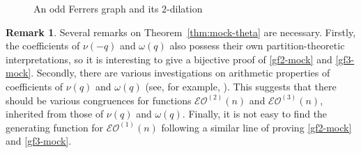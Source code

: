 \documentclass[12pt,reqno]{amsart}
\numberwithin{equation}{section}
\theoremstyle{plain}
\theoremstyle{definition}
\newtheorem{remark}[theorem]{Remark}
\def\EO{\mathcal{EO}}
\begin{document}
\begin{figure}[tbh]
\begin{ferrers}
\end{ferrers}
\caption{An odd Ferrers graph and its $2$-dilation}
\label{fig:2-oddFer}
\end{figure}

\begin{remark}
Several remarks on Theorem~\ref{thm:mock-theta} are necessary. Firstly, the coefficients of $\nu(-q)$ and
$\omega(q)$ also possess their own partition-theoretic interpretations, so it is interesting to give a bijective
proof of \eqref{gf2-mock} and \eqref{gf3-mock}. Secondly, there are various investigations on arithmetic
properties of coefficients of $\nu(q)$ and $\omega(q)$ (see, for example, \cite{GP, BO, APSY}). This suggests
that there should be various congruences for functions $\EO^{(2)}(n)$ and $\EO^{(3)}(n)$, inherited from those
of $\nu(q)$ and $\omega(q)$. Finally, it is not easy to find the generating function for $\mathcal{EO}^{(1)}(n)$
following a similar line of proving \eqref{gf2-mock} and \eqref{gf3-mock}.
\end{remark}
\end{document}
